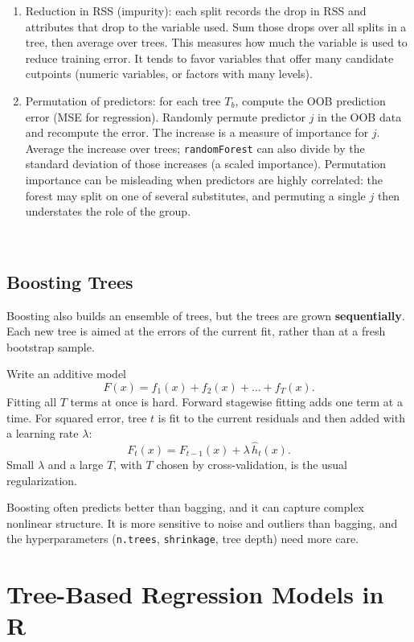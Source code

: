 \documentclass[
]{book}
\begin{document}
\begin{enumerate}
\def\labelenumi{\arabic{enumi}.}
\item
  Reduction in RSS (impurity):
  each split records the drop in RSS and attributes that drop to the variable used. Sum those drops over all splits in a tree, then average over trees. This measures how much the variable is used to reduce training error. It tends to favor variables that offer many candidate cutpoints (numeric variables, or factors with many levels).
\item
  Permutation of predictors:
  for each tree \(T_b\), compute the OOB prediction error (MSE for regression). Randomly permute predictor \(j\) in the OOB data and recompute the error. The increase is a measure of importance for \(j\). Average the increase over trees; \texttt{randomForest} can also divide by the standard deviation of those increases (a scaled importance). Permutation importance can be misleading when predictors are highly correlated: the forest may split on one of several substitutes, and permuting a single \(j\) then understates the role of the group.
\end{enumerate}

~~

\subsection{Boosting Trees}\label{boosting-trees}

Boosting also builds an ensemble of trees, but the trees are grown \textbf{sequentially}. Each new tree is aimed at the errors of the current fit, rather than at a fresh bootstrap sample.

Write an additive model
\[F(x) = f_1(x) + f_2(x) + \ldots + f_T(x).\]
Fitting all \(T\) terms at once is hard. Forward stagewise fitting adds one term at a time. For squared error, tree \(t\) is fit to the current residuals and then added with a learning rate \(\lambda\):
\[
F_t(x) = F_{t-1}(x) + \lambda\,\hat h_t(x).
\]
Small \(\lambda\) and a large \(T\), with \(T\) chosen by cross-validation, is the usual regularization.

Boosting often predicts better than bagging, and it can capture complex nonlinear structure. It is more sensitive to noise and outliers than bagging, and the hyperparameters (\texttt{n.trees}, \texttt{shrinkage}, tree depth) need more care.

\section{Tree-Based Regression Models in R}\label{tree-based-regression-models-in-r}
\end{document}
